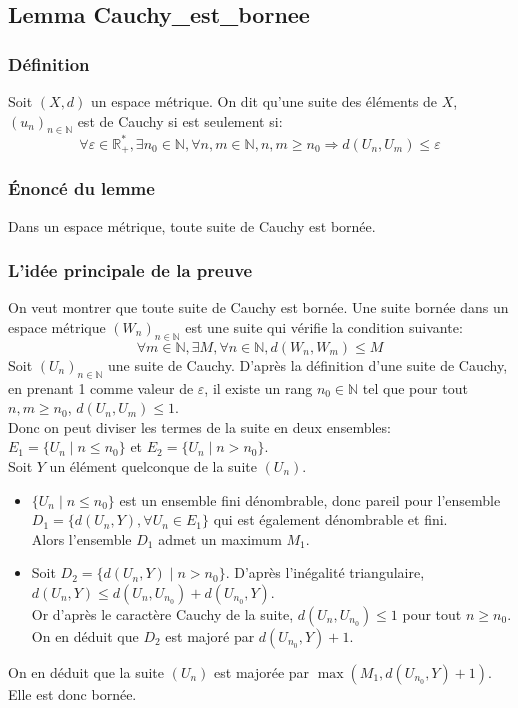 \subsection{Lemma Cauchy\_est\_bornee}
\subsubsection{Définition}
Soit $(X,d)$ un espace métrique. On dit qu'une suite des éléments de $X$, $(u_n)_{n\in \mathbb{N}}$ est de Cauchy si est seulement si: $$\forall \varepsilon \in \mathbb{R_+^*}, \exists n_0 \in \mathbb{N}, \forall n,m \in \mathbb{N}, n,m \geq n_0 \Rightarrow d(U_n,U_m) \leq \varepsilon$$ 
\subsubsection{\'Enoncé du lemme}
Dans un espace métrique, toute suite de Cauchy est bornée.

\subsubsection{L'idée principale de la preuve}
On veut montrer que toute suite de Cauchy est bornée. Une suite bornée dans un espace métrique $(W_n)_{n\in\mathbb{N}}$ est une suite qui vérifie la condition suivante:$$ \forall m \in \mathbb{N}, \exists M , \forall n \in \mathbb{N}, d(W_n,W_m)\leq M $$
Soit $(U_n)_{n\in\mathbb{N}}$ une suite de Cauchy.
D'après la définition d'une suite de Cauchy, en prenant 1 comme valeur de $\varepsilon$, il existe un rang $n_0 \in \mathbb{N}$ tel que pour tout $n,m \geq n_0$, $d(U_n,U_m)\leq 1$.\\ Donc on peut diviser les termes de la suite en deux ensembles: \\ $E_1=\big\{U_n\mid n\leq n_0 \big\}$ et $E_2=\big\{U_n\mid n > n_0 \big\}$. \\
Soit $Y$ un élément quelconque de la suite $(U_n)$.
\begin{itemize}
    \item $\big\{U_n\mid n\leq n_0 \big\}$ est un ensemble fini dénombrable, donc pareil pour l'ensemble $D_1=\big\{d(U_n,Y), \forall U_n\in E_1\big\}$ qui est également dénombrable et fini.\\ Alors l'ensemble $D_1$ admet un maximum $M_1$.
    \item Soit $D_2=\big\{d(U_n,Y)\mid n> n_0 \big\}$. D'après l'inégalité triangulaire, $d(U_n,Y)\leq d(U_n,U_{n_0})+d(U_{n_0},Y)$.\\ Or d'après le caractère Cauchy de la suite, $d(U_n,U_{n_0})\leq 1$ pour tout $n\geq n_0$.\\ On en déduit que $D_2$ est majoré par $d(U_{n_0},Y)+1$. 
\end{itemize}
On en déduit que la suite $(U_n)$ est majorée par $\max(M_1,d(U_{n_0},Y)+1)$. Elle est donc bornée.\\


